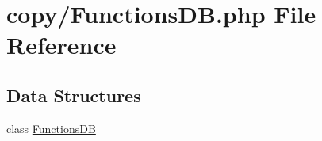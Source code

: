 \hypertarget{copy_2_functions_d_b_8php}{}\section{copy/\+Functions\+D\+B.php File Reference}
\label{copy_2_functions_d_b_8php}
\subsection*{Data Structures}
\begin{DoxyCompactItemize}
\item 
class \hyperlink{class_functions_d_b}{Functions\+D\+B}
\end{DoxyCompactItemize}
